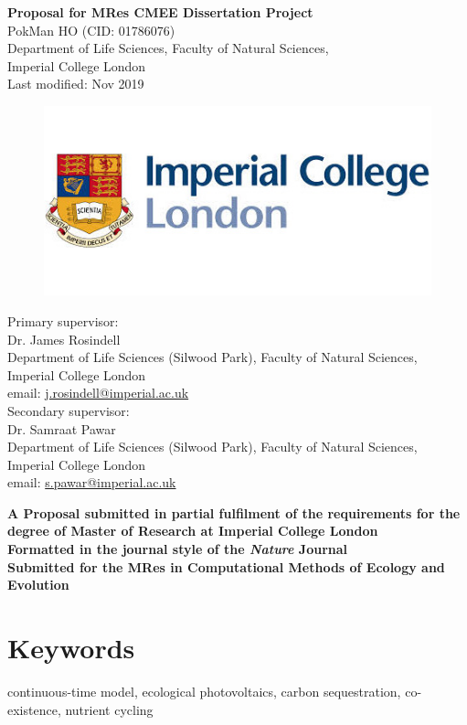 \documentclass[a4paper, 11pt]{article}
\title{\ReportTitle}
\author{\ReportAuthor}
\date{}
\newcommand{\ReportTitle}{Proposal for MRes CMEE Dissertation Project}
\newcommand{\ReportAuthor}{PokMan HO (CID: 01786076)}
\newcommand{\ReportAffil}{Department of Life Sciences, Faculty of Natural Sciences,\\Imperial College London}
\newcommand{\Disclaim}{\textbf{A Proposal submitted in partial fulfilment of the requirements for the degree of Master of Research at Imperial College London\\\vspace{1cm}
		Formatted in the journal style of the \textit{Nature} Journal\\
		Submitted for the MRes in Computational Methods of Ecology and Evolution}}
\begin{document}
	\begin{center}
		\Huge\textbf{\ReportTitle}\\
		\LARGE\ReportAuthor\\
		\Large\ReportAffil\\
		\Large{Last modified: Nov 2019}
	\end{center}
	\begin{figure}[h]
		\centering\includegraphics[width=\linewidth]{icl.jpg}
	\end{figure}
Primary supervisor:\\
\indent Dr. James Rosindell\\
\indent Department of Life Sciences (Silwood Park), Faculty of Natural Sciences, Imperial College London\\
\indent email: \href{mailto:j.rosindell@imperial.ac.uk}{j.rosindell@imperial.ac.uk}\\
Secondary supervisor:\\
\indent Dr. Samraat Pawar\\
\indent Department of Life Sciences (Silwood Park), Faculty of Natural Sciences, Imperial College London\\
\indent email: \href{mailto:s.pawar@imperial.ac.uk}{s.pawar@imperial.ac.uk}
\begin{center}
	\Large\Disclaim
\end{center}
\clearpage
\section{Keywords}
continuous-time model, ecological photovoltaics, carbon sequestration, co-existence, nutrient cycling
\end{document}
